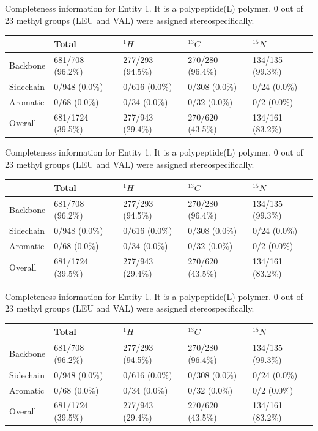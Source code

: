 Completeness information for Entity 1. It is a polypeptide(L) polymer. 0 out of 23 methyl groups (LEU and VAL) were assigned stereospecifically.\begin{longtable}{|l|l|l|l|l|}
\hline
  & Total & $^{1}H$ & $^{13}C$ & $^{15}N$\\\hline
Backbone & 681/708 (96.2\%)& 277/293 (94.5\%)& 270/280 (96.4\%)& 134/135 (99.3\%) \\
\hline
Sidechain & 0/948 (0.0\%)& 0/616 (0.0\%)& 0/308 (0.0\%)& 0/24 (0.0\%) \\
\hline
Aromatic & 0/68 (0.0\%)& 0/34 (0.0\%)& 0/32 (0.0\%)& 0/2 (0.0\%) \\
\hline
Overall & 681/1724 (39.5\%)& 277/943 (29.4\%)& 270/620 (43.5\%)& 134/161 (83.2\%) \\
\hline
\end{longtable}
Completeness information for Entity 1. It is a polypeptide(L) polymer. 0 out of 23 methyl groups (LEU and VAL) were assigned stereospecifically.\begin{longtable}{|l|l|l|l|l|}
\hline
  & Total & $^{1}H$ & $^{13}C$ & $^{15}N$\\\hline
Backbone & 681/708 (96.2\%)& 277/293 (94.5\%)& 270/280 (96.4\%)& 134/135 (99.3\%) \\
\hline
Sidechain & 0/948 (0.0\%)& 0/616 (0.0\%)& 0/308 (0.0\%)& 0/24 (0.0\%) \\
\hline
Aromatic & 0/68 (0.0\%)& 0/34 (0.0\%)& 0/32 (0.0\%)& 0/2 (0.0\%) \\
\hline
Overall & 681/1724 (39.5\%)& 277/943 (29.4\%)& 270/620 (43.5\%)& 134/161 (83.2\%) \\
\hline
\end{longtable}
Completeness information for Entity 1. It is a polypeptide(L) polymer. 0 out of 23 methyl groups (LEU and VAL) were assigned stereospecifically.\begin{longtable}{|l|l|l|l|l|}
\hline
  & Total & $^{1}H$ & $^{13}C$ & $^{15}N$\\\hline
Backbone & 681/708 (96.2\%)& 277/293 (94.5\%)& 270/280 (96.4\%)& 134/135 (99.3\%) \\
\hline
Sidechain & 0/948 (0.0\%)& 0/616 (0.0\%)& 0/308 (0.0\%)& 0/24 (0.0\%) \\
\hline
Aromatic & 0/68 (0.0\%)& 0/34 (0.0\%)& 0/32 (0.0\%)& 0/2 (0.0\%) \\
\hline
Overall & 681/1724 (39.5\%)& 277/943 (29.4\%)& 270/620 (43.5\%)& 134/161 (83.2\%) \\
\hline
\end{longtable}
